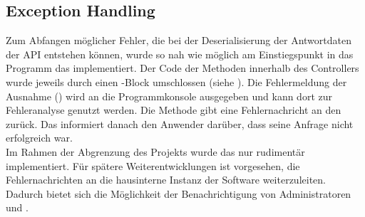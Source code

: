 \subsection{Exception Handling}
\label{sec:ExceptionHandling}
Zum Abfangen möglicher Fehler, die \zB bei der Deserialisierung der Antwortdaten 
der \acs{API} entstehen können, wurde so nah wie möglich am Einstiegspunkt in das 
Programm das  implementiert. Der Code der Methoden 
innerhalb des Controllers  wurde jeweils durch einen
-Block umschlossen (siehe ). 
Die Fehlermeldung der Ausnahme () wird an die Programmkonsole ausgegeben 
und kann dort zur Fehleranalyse genutzt werden. Die Methode gibt eine Fehlernachricht an den 
 zurück. Das  informiert danach
den Anwender darüber, dass seine Anfrage nicht erfolgreich war.\\
Im Rahmen der Abgrenzung des Projekts wurde das  nur rudimentär
implementiert. Für spätere Weiterentwicklungen ist vorgesehen, die Fehlernachrichten
an die hausinterne Instanz der Software  weiterzuleiten.
Dadurch bietet sich die Möglichkeit der Benachrichtigung von Administratoren und
.

